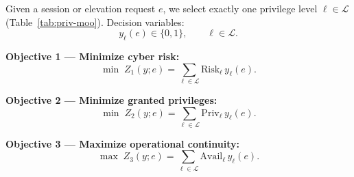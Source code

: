 \documentclass{ieeeaccess}
\begin{document}
Given a session or elevation request $e$, we select exactly one privilege level $\ell\in\mathcal{L}$ (Table~\ref{tab:priv-moo}). Decision variables:
\begin{equation}
y_{\ell}(e)\in\{0,1\}, \qquad \ell\in\mathcal{L}.
\tag{4.5}
\end{equation}

\textbf{Objective 1 --- Minimize cyber risk:}
\begin{equation}
\min\; Z_1(y;e)=\sum_{\ell\in\mathcal{L}} \mathrm{Risk}_{\ell}\, y_{\ell}(e).
\tag{A1}
\end{equation}

\textbf{Objective 2 --- Minimize granted privileges:}
\begin{equation}
\min\; Z_2(y;e)=\sum_{\ell\in\mathcal{L}} \mathrm{Priv}_{\ell}\, y_{\ell}(e).
\tag{A2}
\end{equation}

\textbf{Objective 3 --- Maximize operational continuity:}
\begin{equation}
\max\; Z_3(y;e)=\sum_{\ell\in\mathcal{L}} \mathrm{Avail}_{\ell}\, y_{\ell}(e).
\tag{A3}
\end{equation}
\end{document}
